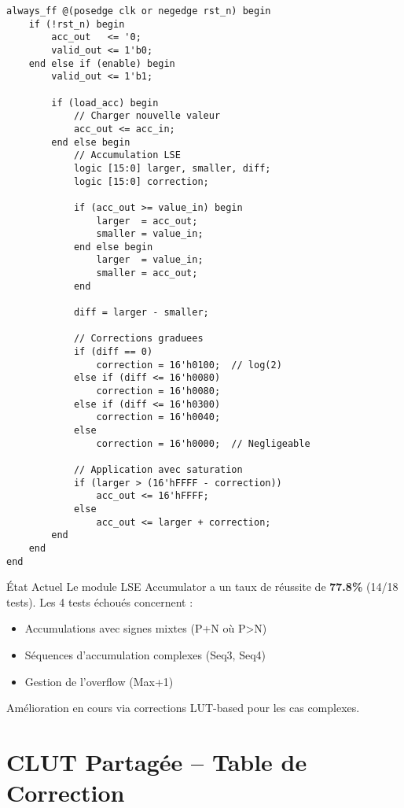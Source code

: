 \documentclass[12pt,a4paper]{article}
\begin{document}
\begin{lstlisting}[style=verilog, caption={Logique de correction de l'accumulateur}]
always_ff @(posedge clk or negedge rst_n) begin
    if (!rst_n) begin
        acc_out   <= '0;
        valid_out <= 1'b0;
    end else if (enable) begin
        valid_out <= 1'b1;
        
        if (load_acc) begin
            // Charger nouvelle valeur
            acc_out <= acc_in;
        end else begin
            // Accumulation LSE
            logic [15:0] larger, smaller, diff;
            logic [15:0] correction;
            
            if (acc_out >= value_in) begin
                larger  = acc_out;
                smaller = value_in;
            end else begin
                larger  = value_in;
                smaller = acc_out;
            end
            
            diff = larger - smaller;
            
            // Corrections graduees
            if (diff == 0)
                correction = 16'h0100;  // log(2)
            else if (diff <= 16'h0080)
                correction = 16'h0080;
            else if (diff <= 16'h0300)
                correction = 16'h0040;
            else
                correction = 16'h0000;  // Negligeable
            
            // Application avec saturation
            if (larger > (16'hFFFF - correction))
                acc_out <= 16'hFFFF;
            else
                acc_out <= larger + correction;
        end
    end
end
\end{lstlisting}

\begin{warnbox}{État Actuel}
Le module LSE Accumulator a un taux de réussite de \textbf{77.8\%} (14/18 tests). Les 4 tests échoués concernent :
\begin{itemize}
    \item Accumulations avec signes mixtes (P+N où P>N)
    \item Séquences d'accumulation complexes (Seq3, Seq4)
    \item Gestion de l'overflow (Max+1)
\end{itemize}
Amélioration en cours via corrections LUT-based pour les cas complexes.
\end{warnbox}

\section{CLUT Partagée -- Table de Correction}
\end{document}
